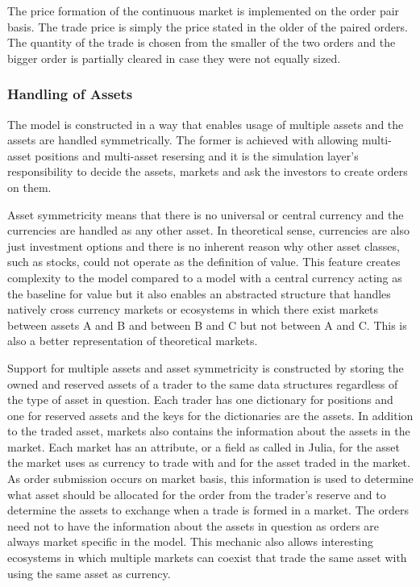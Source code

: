 The price formation of the continuous market is implemented
on the order pair basis. The trade price is simply the price
stated in the older of the paired orders. %
The quantity of the trade is chosen from the smaller of the two orders
and the bigger order is partially cleared in case they were not 
equally sized.



\subsubsection{Handling of Assets}

The model is constructed in a way that enables usage of multiple assets
and the assets are handled symmetrically. The former is achieved with
allowing multi-asset positions and multi-asset resersing and 
it is the simulation layer's responsibility to decide the assets, 
markets and ask the investors to create orders on them. 

Asset symmetricity means that there is no universal or central currency 
and the currencies are handled as any other asset. In theoretical sense, 
currencies are also just investment options and there is no inherent reason why other 
asset classes, such as stocks, could not operate as the definition 
of value. This feature creates complexity to the model compared to a model
with a central currency acting as the baseline for value but it also enables an
abstracted structure that handles natively cross currency
markets or ecosystems in which there exist markets between assets A and 
B and between B and C but not between A and C. This is also a better 
representation of theoretical markets.

Support for multiple assets and asset symmetricity is constructed by storing 
the owned and reserved assets of a trader to the same data structures regardless
of the type of asset in question. Each trader has one dictionary for positions
and one for reserved assets and the keys for the dictionaries are the assets.
In addition to the traded asset, markets also contains the information 
about the assets in the market. Each market has an attribute, or a field as called
in Julia, for the asset the market uses as currency to trade with and for the asset
traded in the market. As order submission occurs on market basis, this information
is used to determine what asset should be allocated for the order from the trader's
reserve and to determine the assets to exchange when a trade is formed in a market. 
The orders need not to have the information about the assets in question as orders are always
market specific in the model. This mechanic also allows interesting ecosystems in which
multiple markets can coexist that trade the same asset with using the same asset as
currency. 

